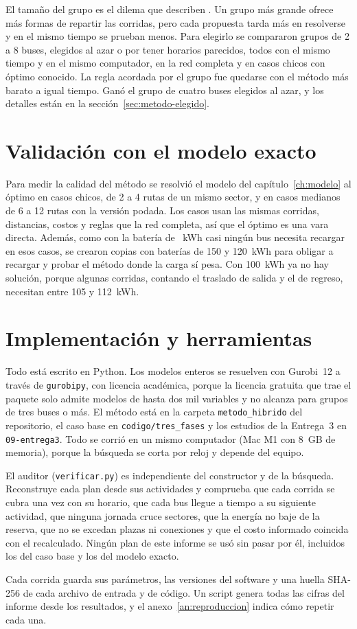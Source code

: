 El tamaño del grupo es el dilema que describen . Un grupo más grande ofrece más formas de repartir las corridas, pero cada propuesta tarda más en resolverse y en el mismo tiempo se prueban menos. Para elegirlo se compararon grupos de 2 a 8 buses, elegidos al azar o por tener horarios parecidos, todos con el mismo tiempo y en el mismo computador, en la red completa y en casos chicos con óptimo conocido. La regla acordada por el grupo fue quedarse con el método más barato a igual tiempo. Ganó el grupo de cuatro buses elegidos al azar, y los detalles están en la sección~\ref{sec:metodo-elegido}.

\section{Validación con el modelo exacto}
\label{sec:validacion}

Para medir la calidad del método se resolvió el modelo del capítulo~\ref{ch:modelo} al óptimo en casos chicos, de 2 a 4 rutas de un mismo sector, y en casos medianos de 6 a 12 rutas con la versión podada. Los casos usan las mismas corridas, distancias, costos y reglas que la red completa, así que el óptimo es una vara directa. Además, como con la batería de \Bateria~kWh casi ningún bus necesita recargar en esos casos, se crearon copias con baterías de 150 y 120~kWh para obligar a recargar y probar el método donde la carga sí pesa. Con 100~kWh ya no hay solución, porque algunas corridas, contando el traslado de salida y el de regreso, necesitan entre 105 y 112~kWh.

\section{Implementación y herramientas}
\label{sec:implementacion}

Todo está escrito en Python. Los modelos enteros se resuelven con Gurobi~12 a través de \texttt{gurobipy}, con licencia académica, porque la licencia gratuita que trae el paquete solo admite modelos de hasta dos mil variables y no alcanza para grupos de tres buses o más. El método está en la carpeta \texttt{metodo\_hibrido} del repositorio, el caso base en \texttt{codigo/tres\_fases} y los estudios de la Entrega~3 en \texttt{09-entrega3}. Todo se corrió en un mismo computador (Mac M1 con 8~GB de memoria), porque la búsqueda se corta por reloj y depende del equipo.

El auditor (\texttt{verificar.py}) es independiente del constructor y de la búsqueda. Reconstruye cada plan desde sus actividades y comprueba que cada corrida se cubra una vez con su horario, que cada bus llegue a tiempo a su siguiente actividad, que ninguna jornada cruce sectores, que la energía no baje de la reserva, que no se excedan plazas ni conexiones y que el costo informado coincida con el recalculado. Ningún plan de este informe se usó sin pasar por él, incluidos los del caso base y los del modelo exacto.

Cada corrida guarda sus parámetros, las versiones del software y una huella SHA-256 de cada archivo de entrada y de código. Un script genera todas las cifras del informe desde los resultados, y el anexo~\ref{an:reproduccion} indica cómo repetir cada una.
